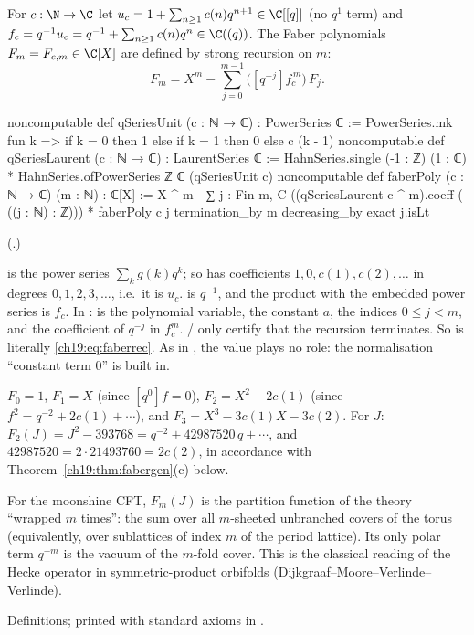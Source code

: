 \begin{definition}\label{ch19:def:faber}
For $c:\N\to\C$ let $u_c=1+\sum_{n\ge1}c(n)q^{n+1}\in\C[[q]]$ (no $q^1$ term) and $f_c=q^{-1}u_c=q^{-1}+\sum_{n\ge1}c(n)q^n\in
\C((q))$.  The Faber polynomials $F_m=F_{c,m}\in\C[X]$ are defined by strong recursion on $m$:
\begin{equation}\label{ch19:eq:faberrec}
  F_m=X^m-\sum_{j=0}^{m-1}\bigl([q^{-j}]f_c^{\,m}\bigr)\,F_j .
\end{equation}
\end{definition}
\begin{leancode}
noncomputable def qSeriesUnit (c : ℕ → ℂ) : PowerSeries ℂ :=
  PowerSeries.mk fun k => if k = 0 then 1 else if k = 1 then 0 else c (k - 1)
noncomputable def qSeriesLaurent (c : ℕ → ℂ) : LaurentSeries ℂ :=
  HahnSeries.single (-1 : ℤ) (1 : ℂ) * HahnSeries.ofPowerSeries ℤ ℂ (qSeriesUnit c)
noncomputable def faberPoly (c : ℕ → ℂ) (m : ℕ) : ℂ[X] :=
  X ^ m - ∑ j : Fin m, C ((qSeriesLaurent c ^ m).coeff (-((j : ℕ) : ℤ))) * faberPoly c j
termination_by m
decreasing_by exact j.isLt
\end{leancode}
(.)
\begin{dictionary}
 is the power series $\sum_kg(k)q^k$; so  has coefficients $1,0,c(1),c(2),\dots$
in degrees $0,1,2,3,\dots$, i.e.\ it is $u_c$.   is $q^{-1}$, and the product with the
embedded power series is $f_c$.  In :  is the polynomial variable,  the constant $a$,
 the indices $0\le j<m$, and  the coefficient of $q^{-j}$ in $f_c^m$.
/ only certify that the recursion terminates.  So  is
literally \eqref{ch19:eq:faberrec}.  As in , the value  plays no role: the normalisation
``constant term $0$'' is built in.
\end{dictionary}
\begin{example}\label{ch19:ex:faber}
$F_0=1$, $F_1=X$ (since $[q^0]f=0$), $F_2=X^2-2c(1)$ (since $f^2=q^{-2}+2c(1)+\cdots$), and
$F_3=X^3-3c(1)X-3c(2)$.  For $J$: $F_2(J)=J^2-393768=q^{-2}+42987520\,q+\cdots$, and $42987520=2\cdot21493760=2c(2)$, in
accordance with Theorem~\ref{ch19:thm:fabergen}(c) below.
\end{example}
\begin{physics}
For the moonshine CFT, $F_m(J)$ is the partition function of the theory ``wrapped $m$ times'': the sum over all
$m$-sheeted unbranched covers of the torus (equivalently, over sublattices of index $m$ of the period lattice).  Its only
polar term $q^{-m}$ is the vacuum of the $m$-fold cover.  This is the classical reading of the Hecke operator in
symmetric-product orbifolds (Dijkgraaf--Moore--Verlinde--Verlinde).
\end{physics}
\begin{status}
Definitions; printed with standard axioms in .
\end{status}

